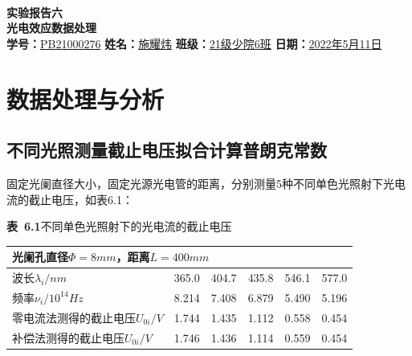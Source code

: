 \documentclass{article}
\date{2022年3月}
\def\kong{\hspace*{2em}}
\begin{document}
\setcounter{page}{1}
\thispagestyle{empty}
\kong
\\[10pt]
\begin{center}
	\textbf{\huge \heiti 实验报告六}\\[6pt]
    \textbf{\huge \heiti 光电效应数据处理}\\[12pt]
	\textbf{学号：}\underline{\kaishu PB21000276} \qquad 
    \textbf{姓名：}\underline{\kaishu 施耀炜} \qquad 
    \textbf{班级：}\underline{\kaishu 21级少院6班}\qquad 
    \textbf{日期：}\underline{2022年5月11日}\\[24pt]
\end{center}
\section{数据处理与分析}
    \subsection{不同光照测量截止电压拟合计算普朗克常数}
        \kong 固定光阑直径大小，固定光源光电管的距离，分别测量5种不同单色光照射下光电流的截止电压，如表6.1：\\[12pt]
        \begin{minipage}{1\linewidth}
            \centering
            \textbf{表\ 6.1}\quad 不同单色光照射下的光电流的截止电压  \\[4pt]
            \begin{tabular}{|llllll|}
                \hline
                \multicolumn{6}{|l|}{光阑孔直径$\Phi=8mm$，距离$L=400mm$}                                                                                                                        \\ \hline
                \multicolumn{1}{|l|}{波长$\lambda_i/nm$}       & \multicolumn{1}{l|}{365.0} & \multicolumn{1}{l|}{404.7} & \multicolumn{1}{l|}{435.8} & \multicolumn{1}{l|}{546.1} & 577.0 \\ \hline
                \multicolumn{1}{|l|}{频率$\nu_i/10^{14}Hz$}    & \multicolumn{1}{l|}{8.214} & \multicolumn{1}{l|}{7.408} & \multicolumn{1}{l|}{6.879} & \multicolumn{1}{l|}{5.490} & 5.196 \\ \hline
                \multicolumn{1}{|l|}{零电流法测得的截止电压$U_{0i}/V$} & \multicolumn{1}{l|}{1.744} & \multicolumn{1}{l|}{1.435} & \multicolumn{1}{l|}{1.112} & \multicolumn{1}{l|}{0.558} & 0.454 \\ \hline
                \multicolumn{1}{|l|}{补偿法测得的截止电压$U_{0i}/V$}  & \multicolumn{1}{l|}{1.746} & \multicolumn{1}{l|}{1.436} & \multicolumn{1}{l|}{1.114} & \multicolumn{1}{l|}{0.559} & 0.454 \\ \hline
            \end{tabular}
        \end{minipage}\\[12pt]
\end{document}
